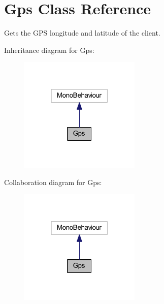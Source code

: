 \hypertarget{class_gps}{}\section{Gps Class Reference}
\label{class_gps}


Gets the G\+PS longitude and latitude of the client.  




Inheritance diagram for Gps\+:\nopagebreak
\begin{figure}[H]
\begin{center}
\leavevmode
\includegraphics[width=163pt]{class_gps__inherit__graph}
\end{center}
\end{figure}


Collaboration diagram for Gps\+:\nopagebreak
\begin{figure}[H]
\begin{center}
\leavevmode
\includegraphics[width=163pt]{class_gps__coll__graph}
\end{center}
\end{figure}
